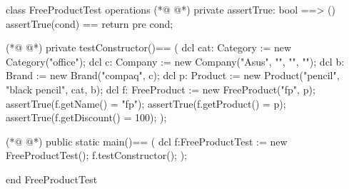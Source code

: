 \begin{vdmpp}[breaklines=true]
class FreeProductTest
 operations
(*@
\label{assertTrue:3}
@*)
  private assertTrue: bool ==> ()
    assertTrue(cond) == return
    pre cond;
    
(*@
\label{testConstructor:7}
@*)
  private testConstructor()==
  (
    dcl cat: Category := new Category("office");
   dcl c: Company := new Company("Asus", "", "", "");
   dcl b: Brand := new Brand("compaq", c);
    dcl p: Product := new Product("pencil", "black pencil", cat, b);
   dcl f: FreeProduct := new FreeProduct("fp", p);
   assertTrue(f.getName() = "fp");
   assertTrue(f.getProduct() = p);
   assertTrue(f.getDiscount() = 100);
  );
 
(*@
\label{main:19}
@*)
  public static main()==
    (
   dcl f:FreeProductTest := new FreeProductTest();
   f.testConstructor();
    );

end FreeProductTest
\end{vdmpp}
